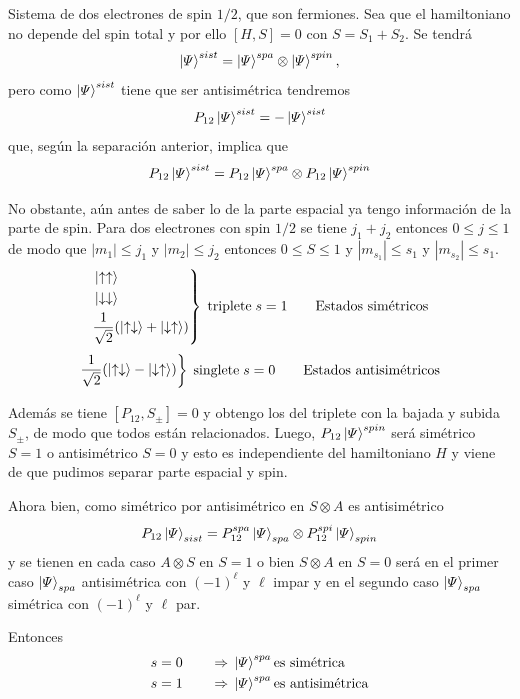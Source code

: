 \documentclass[10pt,oneside]{CBFT_book}
\begin{document}
Sistema de dos electrones de spin $1/2$, que son fermiones. Sea que el hamiltoniano
no depende del spin total y por ello $[H,S]=0$  con $S = S_1 + S_2$. Se tendrá 
\[
	\Ket{\Psi}^{sist} = \Ket{\Psi}^{spa} \otimes \Ket{\Psi}^{spin},
\]
pero como $\Ket{\Psi}^{sist}$ tiene que ser antisimétrica tendremos 
\[
	P_{12} \Ket{\Psi}^{sist} = - \Ket{\Psi}^{sist} 
\]
que, según la separación anterior, implica que 
\[
	P_{12} \Ket{\Psi}^{sist} = P_{12} \Ket{\Psi}^{spa} \otimes P_{12}\Ket{\Psi}^{spin} 
\]

No obstante, aún antes de saber lo de la parte espacial ya tengo información de la
parte de spin.
Para dos electrones con spin $1/2$ se tiene $j_1+j_2$ entonces $ 0 \leq j \leq 1 $ de modo que $|m_1|\leq j_1$ y
$|m_2|\leq j_2$ entonces $0 \leq S \leq 1$ y $|m_{s_1}|\leq s_1$ y $|m_{s_2}|\leq s_1$.
\[
	\left.\begin{aligned}
	& \Ket{\uparrow \uparrow} \\
	& \Ket{\downarrow \downarrow } \\
	& \frac{1}{\sqrt{2}}( \Ket{ \uparrow\downarrow }+\Ket{ \downarrow\uparrow} )
	\end{aligned}
	\right\} \; \text{triplete} \; s=1 \qquad \text{Estados simétricos}
\]
\[
	\left.\begin{aligned}
	\frac{1}{\sqrt{2}}( \Ket{\uparrow\downarrow} - \Ket{\downarrow\uparrow} )
	\end{aligned}
	\right\} \; \text{singlete} \; s=0 \qquad \text{Estados antisimétricos}
\]

Además se tiene $ [P_{12}, S_\pm] = 0 $ y obtengo los del triplete con la bajada y subida $S_\pm$,
de modo que todos están relacionados.
Luego, $ P_{12} \ket{\Psi}^{spin} $ será simétrico $S=1$ o antisimétrico $S=0$ y esto es 
independiente del hamiltoniano $H$ y viene de que pudimos separar parte espacial y spin.

Ahora bien, como simétrico por antisimétrico en $S\otimes A$ es antisimétrico
\[
	P_{12} \Ket{\Psi}_{sist} =
	P_{12}^{spa} \Ket{\Psi}_{spa} \otimes P_{12}^{spi} \Ket{\Psi}_{spin}
\]
y se tienen en cada caso $A \otimes S$ en $S=1$ o bien $S \otimes A$ en $S=0$ será
en el primer caso $\Ket{\Psi}_{spa}$ antisimétrica con $(-1)^\ell$ y $\ell$ impar 
y en el segundo caso $\Ket{\Psi}_{spa}$ simétrica con $(-1)^\ell$ y $\ell$ par. 


Entonces
\begin{gather*}
	\begin{aligned}
	s=0 \qquad \Rightarrow \; &\Ket{\Psi}^{spa} \text{es simétrica} \\
	s=1 \qquad \Rightarrow \; &\Ket{\Psi}^{spa} \text{es antisimétrica}
	\end{aligned}	
\end{gather*}	
\end{document}
